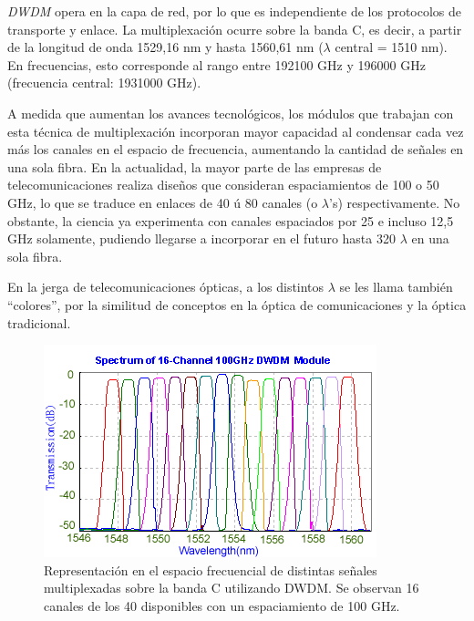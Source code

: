 \emph{DWDM} opera en la capa de red, por lo que es independiente de
los protocolos de transporte y enlace. La multiplexación ocurre sobre
la banda C, es decir, a partir de la longitud de onda 1529,16 nm y
hasta 1560,61 nm ($\lambda$ central = 1510 nm). En frecuencias, esto
corresponde al rango entre 192100 GHz y 196000 GHz (frecuencia
central: 1931000 GHz).

A medida que aumentan los avances tecnológicos, los módulos que
trabajan con esta técnica de multiplexación incorporan mayor capacidad
al condensar cada vez más los canales en el espacio de frecuencia,
aumentando la cantidad de señales en una sola fibra. En la actualidad,
la mayor parte de las empresas de telecomunicaciones realiza diseños
que consideran espaciamientos de 100 o 50 GHz, lo que se traduce en
enlaces de 40 ú 80 canales (o $\lambda$'s) respectivamente. No
obstante, la ciencia ya experimenta con canales espaciados por 25 e
incluso 12,5 GHz solamente, pudiendo llegarse a incorporar en el
futuro hasta 320 $\lambda$ en una sola fibra. 

En la jerga de telecomunicaciones ópticas, a los distintos $\lambda$
se les llama también ``colores'', por la similitud de conceptos en la
óptica de comunicaciones y la óptica tradicional.

\begin{figure}[H]
  \centering
  \includegraphics[scale=1]{Imagenes/DWDM_channels.png}
  \caption{Representación en el espacio frecuencial de distintas
    señales multiplexadas sobre la banda C utilizando DWDM.\cite{bandasdwdm} Se
    observan 16 canales de los 40 disponibles con un espaciamiento de
    100 GHz.}
  \label{fig:dwdmchannels}
\end{figure}


